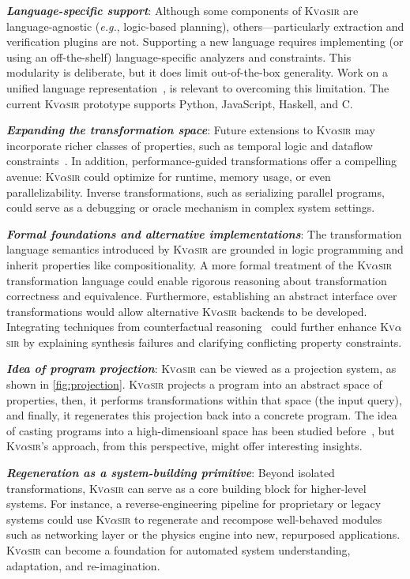 \documentclass[nonacm,sigplan,review]{acmart}
\def\eg{{\em e.g.}, }
\newcommand{\sys}{{\scshape Kv{$\alpha$}sir}\xspace}
\newcommand{\heading}[1]{\vspace{2pt}\noindent\textbf{\emph{#1}}:\enspace}
\begin{document}
\heading{Language-specific support}
Although some components of \sys are language-agnostic (\eg logic-based planning),
others---particularly extraction and verification plugins are not.
Supporting a new language
requires implementing (or using an off-the-shelf) language-specific analyzers and constraints.
This modularity is deliberate,
but it does limit out-of-the-box generality.
Work on a unified language representation~\cite{koppel2018onetool,bap2011,dillig2009sail},
is relevant to overcoming this limitation.
The current \sys prototype
supports Python, JavaScript, Haskell, and C. 

\heading{Expanding the transformation space}
Future extensions to \sys may incorporate richer classes of properties, such as
temporal logic and dataflow
constraints~\cite{azzopardi2023ltl,handa2021orderawaredataflowmodelparallel}.
In addition, performance-guided transformations offer a compelling avenue: \sys
could optimize for runtime, memory usage, or even parallelizability.
Inverse
transformations, such as serializing parallel programs, could serve as
a debugging or oracle mechanism in complex system settings.

\heading{Formal foundations and alternative implementations}
The transformation language semantics introduced by \sys are grounded in logic
programming and inherit properties like compositionality.
A more formal treatment of the \sys
transformation language could enable rigorous reasoning about transformation
correctness and equivalence.
Furthermore, establishing an abstract interface
over transformations would allow alternative \sys backends to be developed.
Integrating techniques from
counterfactual reasoning~\cite{Cabalar_2020} could further enhance \sys by
explaining synthesis failures and clarifying conflicting property constraints.

\heading{Idea of program projection}
\sys can be viewed as a projection system, as shown in \cref{fig:projection}.
\sys projects a program into an abstract space of properties, 
then, it performs transformations within that space (the input query),
and finally, it regenerates this projection back into a concrete program.
The idea of casting programs into a high-dimensioanl space has been studied before~\cite{ben-nun2018neural,alon2019code2vec,ellis2020dreamcoder,nye2021platypus},
but \sys's approach, from this perspective, might offer interesting insights.

\heading{Regeneration as a system-building primitive}
Beyond isolated transformations, \sys can serve as a core building block for
higher-level systems.
For instance, a reverse-engineering pipeline for
proprietary or legacy systems could use \sys to regenerate and recompose
well-behaved modules such as networking layer or the physics engine into new,
repurposed applications.
\sys can become a foundation for automated system understanding, adaptation, and re-imagination.
\end{document}
